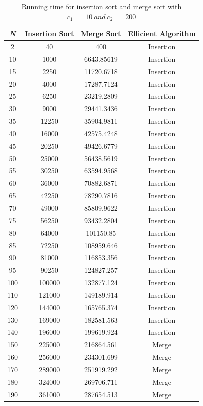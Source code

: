 \documentclass[12pt,a4paper]{book}
\begin{document}
\begin{table}
\begin{center}
\begin{tabular}{|c|c|c|c|}
\hline 
\textit{N} & Insertion Sort & Merge Sort & Efficient Algorithm \\ 
\hline 
2 & 40 & 400 & Insertion \\
10 & 1000 & 6643.85619 & Insertion \\
15 & 2250 & 11720.6718 & Insertion \\
20 & 4000 & 17287.7124 & Insertion \\
25 & 6250 & 23219.2809 & Insertion \\
30 & 9000 & 29441.3436 & Insertion \\
35 & 12250 & 35904.9811 & Insertion \\
40 & 16000 & 42575.4248 & Insertion \\
45 & 20250 & 49426.6779 & Insertion \\
50 & 25000 & 56438.5619 & Insertion \\
55 & 30250 & 63594.9568 & Insertion \\
60 & 36000 & 70882.6871 & Insertion \\
65 & 42250 & 78290.7816 & Insertion \\
70 & 49000 & 85809.9622 & Insertion \\
75 & 56250 & 93432.2804 & Insertion \\
80 & 64000 & 101150.85 & Insertion \\
85 & 72250 & 108959.646 & Insertion \\
90 & 81000 & 116853.356 & Insertion \\
95 & 90250 & 124827.257 & Insertion \\
100 & 100000 & 132877.124 & Insertion \\
110 & 121000 & 149189.914 & Insertion \\
120 & 144000 & 165765.374 & Insertion \\
130 & 169000 & 182581.563 & Insertion \\
140 & 196000 & 199619.924 & Insertion \\
150 & 225000 & 216864.561 & Merge \\
160 & 256000 & 234301.699 & Merge \\
170 & 289000 & 251919.292 & Merge \\
180 & 324000 & 269706.711 & Merge \\
190 & 361000 & 287654.513 & Merge \\
 \hline
\end{tabular}
\caption{Running time for insertion sort and merge sort with $c_{1}\ =\ 10\ and\ c_{2}\ =\ 200$}
\label{table:1}
\end{center}
\end{table}
\end{document}
